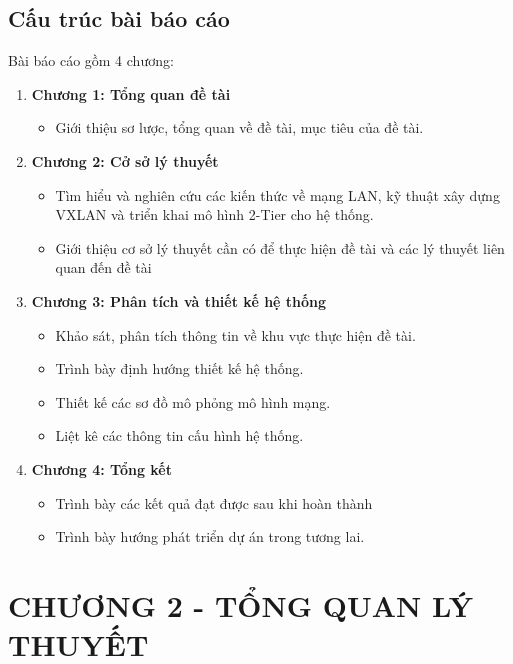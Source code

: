 \documentclass[13pt]{article}
\renewcommand{\thesubsection}{\thesection.\arabic{subsection}} %
\begin{document}
    \subsection{Cấu trúc bài báo cáo}
    Bài báo cáo gồm 4 chương:
    \begin{enumerate}
        \item \textbf{Chương 1: Tổng quan đề tài}
        \begin{itemize}
            \item Giới thiệu sơ lược, tổng quan về đề tài, mục tiêu của đề tài.
        \end{itemize}
        
        \item \textbf{Chương 2: Cở sở lý thuyết}
        \begin{itemize}
            \item Tìm hiểu và nghiên cứu các kiến thức về mạng LAN, kỹ thuật xây dựng VXLAN và triển khai mô hình 2-Tier cho hệ thống.
            \item Giới thiệu cơ sở lý thuyết cần có để thực hiện đề tài và các lý thuyết liên quan đến đề tài
        \end{itemize}
        \item \textbf{Chương 3: Phân tích và thiết kế hệ thống}
        \begin{itemize}
            \item Khảo sát, phân tích thông tin về khu vực thực hiện đề tài.
            \item Trình bày định hướng thiết kế hệ thống.
            \item Thiết kế các sơ đồ mô phỏng mô hình mạng.
            \item Liệt kê các thông tin cấu hình hệ thống.
        \end{itemize}
        \item \textbf{Chương 4: Tổng kết}
        \begin{itemize}
            \item Trình bày các kết quả đạt được sau khi hoàn thành
            \item Trình bày hướng phát triển dự án trong tương lai.
        \end{itemize}
    \end{enumerate}

\newpage
\renewcommand{\thesubsection}{\thesection.\arabic{subsection}} %
\setcounter{section}{2} %
\setcounter{subsection}{0}
\section*{CHƯƠNG 2 - TỔNG QUAN LÝ THUYẾT}
\end{document}
